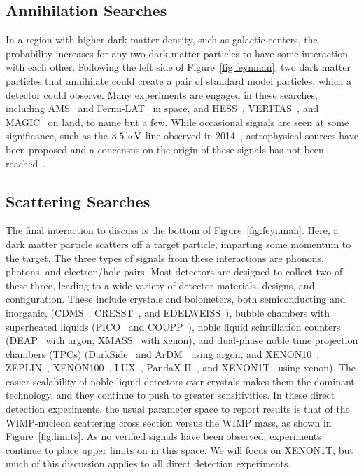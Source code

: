 \subsection{Annihilation Searches}

In a region with higher dark matter density, such as galactic centers, the probability increases for any two dark matter particles to have some interaction with each other. Following the left side of Figure~\ref{fig:feynman}, two dark matter particles that annihilate could create a pair of standard model particles, which a detector could observe. Many experiments are engaged in these searches, including AMS~\cite{Aguilar:2013} and Fermi-LAT~\cite{Ackermann:2013uma} in space, and HESS~\cite{Abramowski:2014tra}, VERITAS~\cite{Arlen:2012}, and MAGIC~\cite{Aleksic:2013xea} on land, to name but a few. While occasional signals are seen at some significance, such as the $3.5\,\mathrm{keV}$ line observed in 2014~\cite{Boyarsky:2014jta,Bulbul:2014sua}, astrophysical sources have been proposed and a concensus on the origin of these signals has not been reached~\cite{Shah:2016efh,Ahnen:2016qkx,Abdallah:2016ygi,Archambault:2017wyh,Albert:2016uux}.

\subsection{Scattering Searches}

The final interaction to discuss is the bottom of Figure~\ref{fig:feynman}. Here, a dark matter particle scatters off a target particle, imparting some momentum to the target. The three types of signals from these interactions are phonons, photons, and electron/hole pairs. Most detectors are designed to collect two of these three, leading to a wide variety of detector materials, designs, and configuration. These include crystals and bolometers, both semiconducting and inorganic, (CDMS~\cite{Akerib:2005,Agnese:2015ywx}, CRESST~\cite{Kluck:2017hnn}, and EDELWEISS~\cite{Armengaud:2009hc,Armengaud:2017rzu}), bubble chambers with superheated liquids (PICO~\cite{Amole:2015pla,Amole:2017dex} and COUPP~\cite{Manuel:2016klm}), noble liquid scintillation counters (DEAP~\cite{Amaudruz:2017ibl,Amaudruz:2017ekt} with argon, XMASS~\cite{Abe:2013tc} with xenon), and dual-phase noble time projection chambers (TPCs) (DarkSide~\cite{Agnes:2014bvk,Agnes:2015ftt} and ArDM~\cite{Marchionni:2010fi,Calvo:2015uln,Calvo:2016hve} using argon, and XENON10~\cite{Angle:2007uj}, ZEPLIN~\cite{Akimov:2011tj}, XENON100~\cite{Aprile:2011dd,Aprile:2013doa}, LUX~\cite{Akerib:2013tjd}, PandaX-II~\cite{Cui:2017nnn}, and XENON1T~\cite{Aprile:2017aty} using xenon). The easier scalability of noble liquid detectors over crystals makes them the dominant technology, and they continue to push to greater sensitivities. In these direct detection experiments, the usual parameter space to report results is that of the WIMP-nucleon scattering cross section versus the WIMP mass, as shown in Figure~\ref{fig:limits}. As no verified signals have been observed, experiments continue to place upper limits on in this space. We will focus on XENON1T, but much of this discussion applies to all direct detection experiments.

